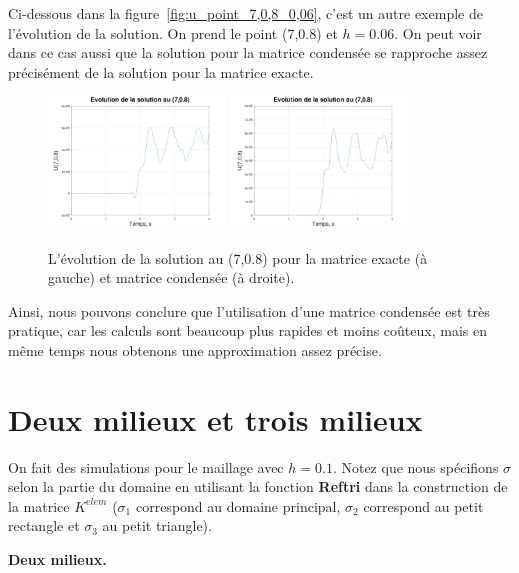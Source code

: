 \documentclass[12pt]{article}
\begin{document}
Ci-dessous dans la figure~\eqref{fig:u_point_7,0,8_0,06}, c'est un autre exemple de l'évolution de la solution. On prend le point (7,0.8) et $h=0.06$. On peut voir dans ce cas aussi que la solution pour la matrice condensée se rapproche assez précisément de la solution pour la matrice exacte.
\begin{figure}[H]
	\hspace{1cm}\includegraphics[width=0.42\textwidth]{images/u_7,0,8_0,06}\hspace{1cm}
	\includegraphics[width=0.42\textwidth]{images/u_7,0,8_0,06_condense}\hspace{1cm}
	\caption{L'évolution de la solution au (7,0.8) pour la matrice exacte (à gauche) et matrice condensée (à droite).}
	\label{fig:u_point_7,0,8_0,06}
\end{figure}

Ainsi, nous pouvons conclure que l'utilisation d'une matrice condensée est très pratique, car les calculs sont beaucoup plus rapides et moins coûteux, mais en même temps nous obtenons une approximation assez précise.

\section{Deux milieux et trois milieux}
On fait des simulations pour le maillage avec $h=0.1$. Notez que nous spécifions $\sigma$ selon la partie du domaine en utilisant la fonction \textbf{Reftri} dans la construction de la matrice $K^{elem}$ ($\sigma_1$ correspond au domaine principal, $\sigma_2$ correspond au petit rectangle et $\sigma_3$ au petit triangle). 

\textbf{Deux milieux.}
\end{document}

